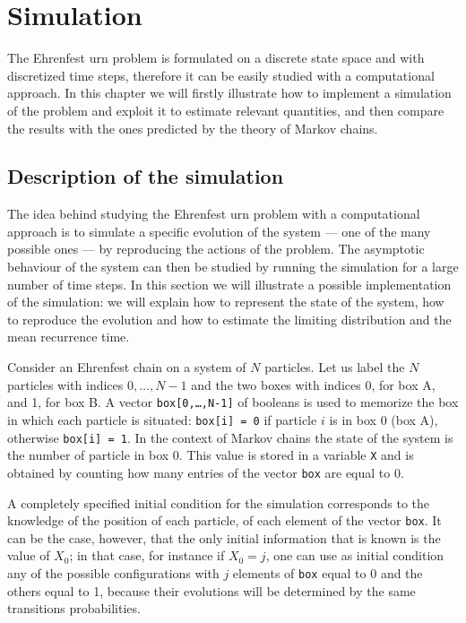 \chapter{Simulation}
The Ehrenfest urn problem is formulated on a discrete state space and with discretized time steps, therefore it can be easily studied with a computational approach. In this chapter we will firstly illustrate how to implement a simulation of the problem and exploit it to estimate relevant quantities, and then compare the results with the ones predicted by the theory of Markov chains.

\section{Description of the simulation}
The idea behind studying the Ehrenfest urn problem with a computational approach is to simulate a specific evolution of the system --- one of the many possible ones --- by reproducing the actions of the problem. The asymptotic behaviour of the system can then be studied by running the simulation for a large number of time steps. In this section we will illustrate a possible implementation of the simulation: we will explain how to represent the state of the system, how to reproduce the evolution and how to estimate the limiting distribution and the mean recurrence time.

Consider an Ehrenfest chain on a system of $N$ particles. Let us label the $N$ particles with indices $0, \dots,N-1$ and the two boxes with indices 0, for box A, and 1, for box B. A vector \texttt{box[0,\dots,N-1]} of booleans is used to memorize the box in which each particle is situated: \texttt{box[i] = 0} if particle $i$ is in box 0 (\ie box A), otherwise \texttt{box[i] = 1}. In the context of Markov chains the state of the system is the number of particle in box 0. This value is stored in a variable \texttt{X} and is obtained by counting how many entries of the vector \texttt{box} are equal to 0. 

A completely specified initial condition for the simulation corresponds to the knowledge of the position of each particle, \ie of each element of the vector \texttt{box}. It can be the case, however, that the only initial information that is known is the value of $X_0$; in that case, for instance if $X_0 = j$, one can use as initial condition any of the possible configurations with $j$ elements of \texttt{box} equal to 0 and the others equal to 1, because their evolutions will be determined by the same transitions probabilities.

